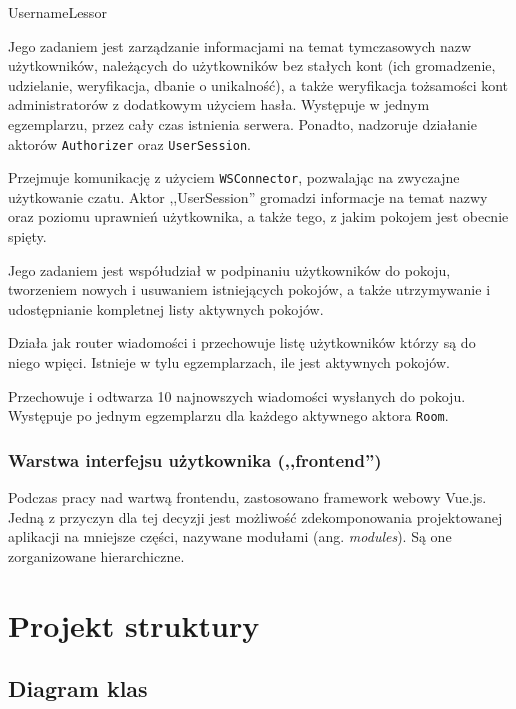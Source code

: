 \begin{labeling}{UsernameLessor}
  \item[\texttt{UsernameLessor}] Jego zadaniem jest zarządzanie informacjami na
  temat tymczasowych nazw użytkowników, należących do	użytkowników bez stałych
  kont (ich gromadzenie, udzielanie, weryfikacja, dbanie o unikalność), a także
  weryfikacja tożsamości kont administratorów z dodatkowym użyciem hasła.
  Występuje w jednym egzemplarzu, przez cały czas istnienia serwera. Ponadto,
  nadzoruje działanie aktorów \texttt{Authorizer} oraz \texttt{UserSession}.

  \item[\texttt{UserSession}] Przejmuje komunikację z użyciem
  \texttt{WSConnector}, pozwalając na zwyczajne użytkowanie czatu. Aktor
  ,,UserSession'' gromadzi informacje na temat nazwy oraz poziomu uprawnień
  użytkownika, a także tego, z jakim pokojem jest obecnie spięty.

  \item[\texttt{Landlord}] Jego zadaniem jest współudział w podpinaniu
  użytkowników do pokoju, tworzeniem nowych i usuwaniem istniejących pokojów, a
  także utrzymywanie i udostępnianie kompletnej listy aktywnych pokojów.

  \item[\texttt{Room}] Działa jak router wiadomości i przechowuje listę użytkowników którzy są do niego wpięci. Istnieje w tylu egzemplarzach, ile jest aktywnych pokojów.

  \item[\texttt{MessageCache}] Przechowuje i odtwarza 10 najnowszych wiadomości wysłanych do pokoju. Występuje po jednym egzemplarzu dla każdego aktywnego aktora \texttt{Room}.

\end{labeling}

\subsubsection{Warstwa interfejsu użytkownika (,,frontend'')}
Podczas pracy nad wartwą frontendu, zastosowano framework webowy Vue.js. Jedną
z przyczyn dla tej decyzji jest możliwość zdekomponowania projektowanej aplikacji na mniejsze części, nazywane modułami (ang. \textit{modules}). Są one zorganizowane hierarchiczne.

\section{Projekt struktury}

\subsection{Diagram klas}

